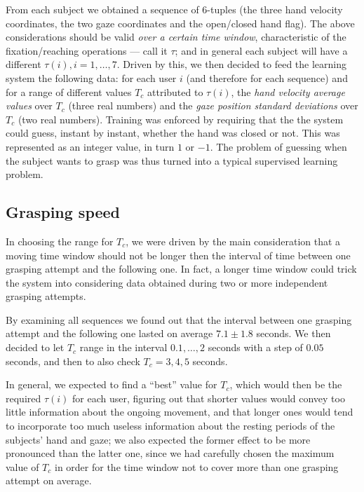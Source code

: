 \documentclass[a4paper,10pt,conference]{ieeeconf}
\begin{document}
From each subject we obtained a sequence of $6$-tuples (the three hand
velocity coordinates, the two gaze coordinates and the open/closed
hand flag). The above considerations should be valid \emph{over a
certain time window}, characteristic of the fixation/reaching
operations --- call it $\tau$; and in general each subject will have a
different $\tau(i), i=1,\ldots,7$. Driven by this, we then decided to
feed the learning system the following data: for each user $i$ (and
therefore for each sequence) and for a range of different values $T_c$
attributed to $\tau(i)$, the \emph{hand velocity average values} over
$T_c$ (three real numbers) and the \emph{gaze position standard
deviations} over $T_c$ (two real numbers). Training was enforced by
requiring that the the system could guess, instant by instant, whether
the hand was closed or not. This was represented as an integer value,
in turn $1$ or $-1$. The problem of guessing when the subject wants to
grasp was thus turned into a typical supervised learning problem.

\subsection{Grasping speed}

In choosing the range for $T_c$, we were driven by the main
consideration that a moving time window should not be longer then the
interval of time between one grasping attempt and the following
one. In fact, a longer time window could trick the system into
considering data obtained during two or more independent grasping
attempts.

By examining all sequences we found out that the interval between one
grasping attempt and the following one lasted on average $7.1 \pm 1.8$
seconds. We then decided to let $T_c$ range in the interval
$0.1,\ldots,2$ seconds with a step of $0.05$ seconds, and then to also
check $T_c=3,4,5$ seconds.

In general, we expected to find a ``best'' value for $T_c$, which
would then be the required $\tau(i)$ for each user, figuring out that
shorter values would convey too little information about the ongoing
movement, and that longer ones would tend to incorporate too much
useless information about the resting periods of the subjects' hand
and gaze; we also expected the former effect to be more pronounced
than the latter one, since we had carefully chosen the maximum value
of $T_c$ in order for the time window not to cover more than one
grasping attempt on average.
\end{document}
